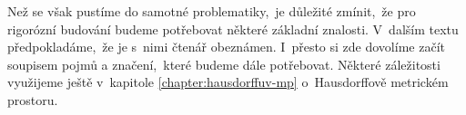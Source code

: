 Než se však pustíme do samotné problematiky,~je důležité zmínit,~že pro rigorózní budování budeme potřebovat některé základní znalosti. V~dalším textu předpokladáme,~že je s~nimi čtenář obeznámen. I~přesto si zde dovolíme začít soupisem pojmů a značení,~které budeme dále potřebovat. Některé záležitosti využijeme ještě v~kapitole \ref{chapter:hausdorffuv-mp} o~Hausdorffově metrickém prostoru.






